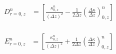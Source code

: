 \documentclass[12pt]{article}
\begin{document}
		\begin{equation}
      \begin{aligned}
        D^n_{r=0, z} &= \left [\frac{\kappa^n_{0, z}}{(\Delta z)^2} - \frac{1}{2\Delta z}(\frac{\Delta\kappa}{\Delta z})^n_{0, z}  \right ] \\
      \end{aligned}
		\end{equation}
		
		\begin{equation}
      \begin{aligned}
        E^n_{r=0, z} &= \left [ \frac{\kappa^n_{0, z}}{(\Delta z)^2} + \frac{1}{2\Delta z}(\frac{\Delta\kappa}{\Delta z})^n_{0, z} \right ] \\
      \end{aligned}
		\end{equation}
\end{document}
